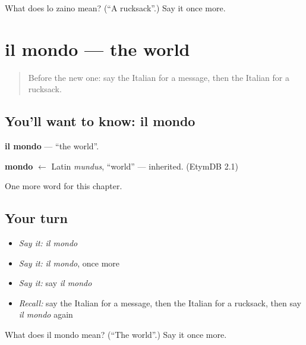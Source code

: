 \begin{tcolorbox}[breakable,colback=teal!4,colframe=teal!35!black,title={Before you move on}]
What does lo zaino mean? (\textquotedblleft{}A rucksack\textquotedblright{}.) Say it once more.
\end{tcolorbox}
\section[il mondo]{il mondo — the world}

\label{lesson:IT-C102-mondo}



\begin{quote}
Before the new one: say the Italian for a message, then the Italian for a rucksack.
\end{quote}

\subsection*{You'll want to know: il mondo}
\textbf{il mondo} — \textquotedblleft{}the world\textquotedblright{}.

\begin{cousinweb}
\textbf{mondo} $\leftarrow$ Latin \emph{mundus}, \textquotedblleft{}world\textquotedblright{} — inherited. (EtymDB 2.1)
\end{cousinweb}

\begin{grammarlens}[title={What you've built}]
One more word for this chapter.
\end{grammarlens}

\subsection*{Your turn}
\begin{itemize}
\raggedright
  \item \emph{Say it:} \emph{il mondo}
  \item \emph{Say it:} \emph{il mondo}, once more
  \item \emph{Say it:} say \emph{il mondo}
  \item \emph{Recall:} say the Italian for a message, then the Italian for a rucksack, then say \emph{il mondo} again
\end{itemize}

\begin{tcolorbox}[breakable,colback=teal!4,colframe=teal!35!black,title={Before you move on}]
What does il mondo mean? (\textquotedblleft{}The world\textquotedblright{}.) Say it once more.
\end{tcolorbox}
